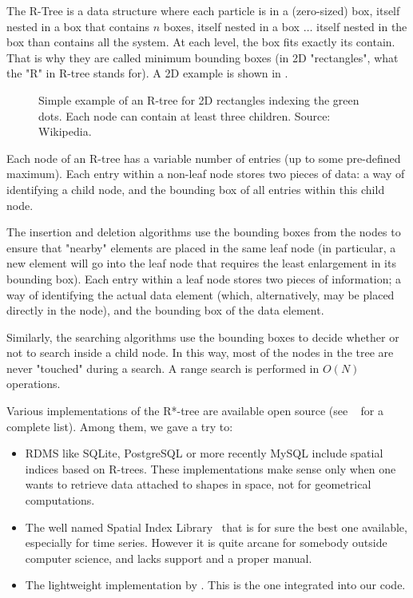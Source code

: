 The R-Tree is a data structure where each particle is in a (zero-sized) box, itself nested in a box that contains $n$ boxes, itself nested in a box $\ldots$ itself nested in the box than contains all the system. At each level, the box fits exactly its contain. That is why they are called minimum bounding boxes (in 2D "rectangles", what the "R" in R-tree stands for). A 2D example is shown in .

\begin{figure}
	\centering
	\def\svgwidth{0.8\textwidth}
	\caption{Simple example of an R-tree for 2D rectangles indexing the green dots. Each node can contain at least three children. Source: Wikipedia.}
	\label{fig:rtree}
\end{figure}

Each node of an R-tree has a variable number of entries (up to some pre-defined maximum). Each entry within a non-leaf node stores two pieces of data: a way of identifying a child node, and the bounding box of all entries within this child node.

The insertion and deletion algorithms use the bounding boxes from the nodes to ensure that "nearby" elements are placed in the same leaf node (in particular, a new element will go into the leaf node that requires the least enlargement in its bounding box). Each entry within a leaf node stores two pieces of information; a way of identifying the actual data element (which, alternatively, may be placed directly in the node), and the bounding box of the data element.

Similarly, the searching algorithms use the bounding boxes to decide whether or not to search inside a child node. In this way, most of the nodes in the tree are never "touched" during a search. A range search is performed in $O(N)$ operations.

Various implementations of the R*-tree are available open source (see ~\citep{Theodoridis2003} for a complete list). Among them, we gave a try to: 
\begin{itemize}
	\item \acs{RDMS} like SQLite, PostgreSQL or more recently MySQL include spatial indices based on R-trees. These implementations make sense only when one wants to retrieve data attached to shapes in space, not for geometrical computations.
	\item The well named Spatial Index Library~\citep{Hadjieleftheriou2005} that is for sure the best one available, especially for time series. However it is quite arcane for somebody outside computer science, and lacks support and a proper manual.
	\item The lightweight implementation by \citet{Spicuzza2008}. This is the one integrated into our code.
\end{itemize}

